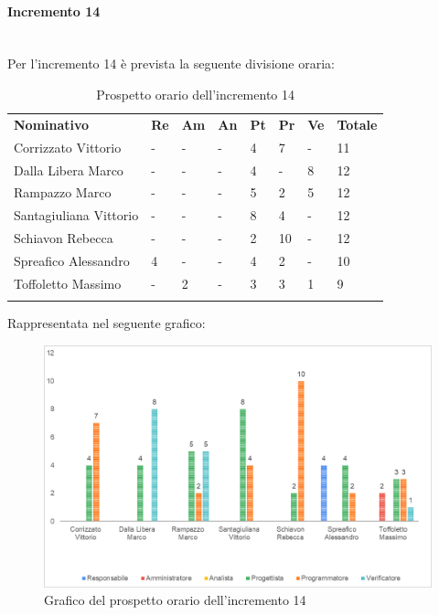 \paragraph{Incremento 14} \mbox{} \\
Per l'incremento 14 è prevista la seguente divisione oraria:
\begin{longtable} {				
		>{}p{40mm}  
		>{}p{8mm}
		>{}p{8mm}
		>{}p{8mm}
		>{}p{8mm}
		>{}p{8mm}
		>{}p{8mm}
		>{}p{12mm}				
	}			
	\rowcolor{gray!50}
	\textbf{Nominativo} & \textbf{Re} & \textbf{Am} & \textbf{An} & \textbf{Pt} & \textbf{Pr} & \textbf{Ve} & \textbf{Totale}	\TBstrut \\ [2mm]
	Corrizzato Vittorio & - & - & - & 4 & 7 & - & 11 \TBstrut \\ [2mm]
	Dalla Libera Marco & - & - & - & 4 & - & 8 & 12 \TBstrut \\ [2mm]
	Rampazzo Marco & - & - & - & 5 & 2 & 5 & 12 \TBstrut \\ [2mm]
	Santagiuliana Vittorio & - & - & - & 8 & 4 & - & 12 \TBstrut \\ [2mm]
	Schiavon Rebecca & - & - & - & 2 & 10 & - & 12 \TBstrut \\ [2mm]
	Spreafico Alessandro & 4 & - & - & 4 & 2 & - & 10 \TBstrut \\ [2mm]
	Toffoletto Massimo & - & 2 & - & 3 & 3 & 1 & 9 \TBstrut \\ [2mm]
	\rowcolor{white}
	\caption{Prospetto orario dell'incremento 14}
\end{longtable}
Rappresentata nel seguente grafico:
\begin{figure} [H]
	\includegraphics[width=\linewidth]{./img/Grafici/21.png}
	\caption{Grafico del prospetto orario dell'incremento 14}
\end{figure}
